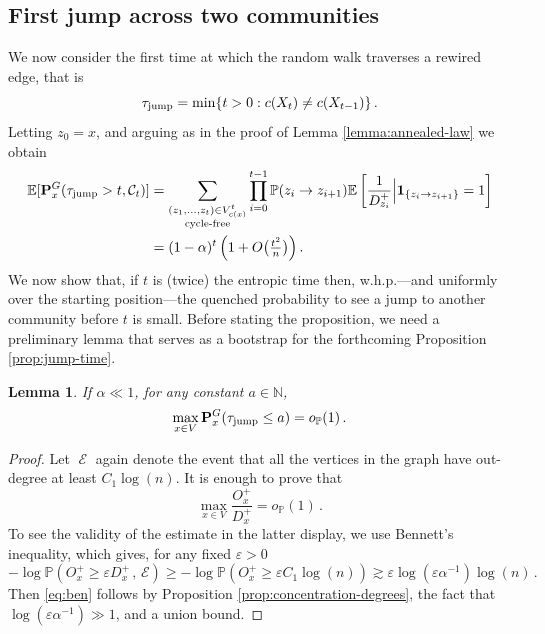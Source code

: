 \documentclass[11pt,oneside]{amsart}
\numberwithin{equation}{section}  %
\theoremstyle{plain}
\newtheorem{lemma}[theorem]{Lemma}
\newcommand{\N}{\mathbb{N}}
\DeclareMathOperator{\cE}{\mathcal{E}}
\newcommand{\E}{\mathbb{E}}
\newcommand{\p}{\mathbb{P}}
\newcommand{\PP}{\mathbb{P}}
\newcommand{\one}{\textup{\textbf{1}}}
\newcommand{\op}{o_{\p}}
\newcommand{\tent}{t_{\textup{ent}}}
\newcommand{\quenchG}{\mathbf{P}^G}
\newcommand{\tauj}{\tau_{\textup{jump}}}
\begin{document}
\subsection{First jump across two communities}
We now consider the first time at which the random walk traverses a rewired edge, that is
\begin{equation}\label{eq:def-tau-jump}
	\tauj=\min\{t>0 : c(X_t)\neq c(X_{t-1})\}\,.
\end{equation}
%
Letting $z_0=x$, and arguing as in the proof of Lemma \ref{lemma:annealed-law} we obtain
\begin{equation} \label{eq:jump-C}
\begin{split}
    \E[\quenchG_x(\tauj > t, \mathcal{C}_t)]
    &=\sum_{\substack{(z_1, \dots, z_{t}) \in V_{c(x)}^{t}\\\text{cycle-free} }} \prod_{i=0}^{t-1} \PP(z_i\to z_{i+1})\E\left[\frac{1}{{D}^+_{z_i}}\Big| \one_{\{z_i\to z_{i+1}\}}=1\right]\\
    &
    =(1-\alpha)^t\left(1+O\big(\tfrac{t^2}n\big)\right).\\    
\end{split}
\end{equation}
We now show that, if $t$ is (twice) the entropic time then, w.h.p.---and uniformly over the starting position---the quenched probability to see a jump to another community before $t$ is small. Before stating the proposition, we need a preliminary lemma that serves as a bootstrap for the forthcoming Proposition \ref{prop:jump-time}.
\begin{lemma}\label{lemma:prelim} If $\alpha\ll 1$, for any constant $a\in\N$,
	\begin{equation}
	\max_{x \in V}\quenchG_x(\tauj \le a) = \op(1)\,.
	\end{equation}
\end{lemma}
\begin{proof}
    Let $\cE$ again denote the event that all the vertices in the graph have out-degree at least $C_1\log(n)$.
	It is enough to prove that
	\begin{equation}\label{eq:ben}
		\max_{x\in V}\frac{O_x^+}{D_x^+}=\op(1)\,.
	\end{equation}
	To see the validity of the estimate in the latter display, we use Bennett's inequality, which gives, for any fixed $\varepsilon>0$
	\begin{equation}
		-\log \PP(O_x^+\ge \varepsilon D_x^+\,,\,\mathcal{E})
        \ge
        -\log \PP(O_x^+\ge \varepsilon C_1 \log(n))
        \gtrsim \varepsilon\log(\varepsilon\alpha^{-1})\log(n)\,.
	\end{equation}
Then \eqref{eq:ben} follows by Proposition \ref{prop:concentration-degrees}, the fact that $\log(\varepsilon\alpha^{-1})\gg 1$, and a union bound.
\end{proof}
\end{document}
